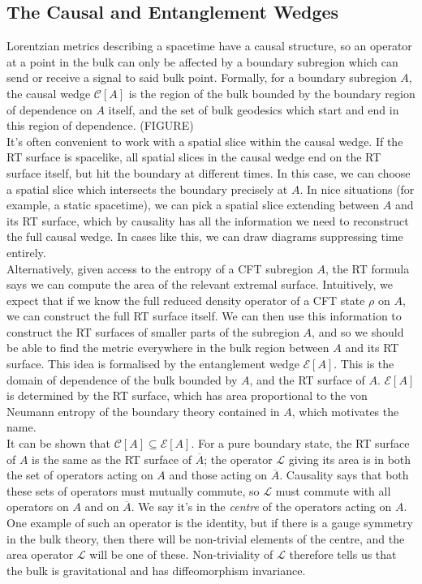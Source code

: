 \documentclass[12pt,a4paper]{report}
\numberwithin{equation}{section}
\newcommand{\ol}[1]{\overline{#1}}
\theoremstyle{definition}
\theoremstyle{theorem}
\theoremstyle{theorem}
\theoremstyle{example}
\theoremstyle{definition}
\begin{document}
\subsection{The Causal and Entanglement Wedges}
Lorentzian metrics describing a spacetime have a causal structure, so an operator at a point in the bulk can only be affected by a boundary subregion which can send or receive a signal to said bulk point. Formally, for a boundary subregion $A$, the causal wedge $\mathcal{C}[A]$ is the region of the bulk bounded by the boundary region of dependence on $A$ itself, and the set of bulk geodesics which start and end in this region of dependence. (FIGURE)\\
It's often convenient to work with a spatial slice within the causal wedge. If the RT surface is spacelike, all spatial slices in the causal wedge end on the RT surface itself, but hit the boundary at different times. In this case, we can choose a spatial slice which intersects the boundary precisely at $A$. In nice situations (for example, a static spacetime), we can pick a spatial slice extending between $A$ and its RT surface, which by causality has all the information we need to reconstruct the full causal wedge. In cases like this, we can draw diagrams suppressing time entirely.\\
Alternatively, given access to the entropy of a CFT subregion $A$, the RT formula says we can compute the area of the relevant extremal surface. Intuitively, we expect that if we know the full reduced density operator of a CFT state $\rho$ on $A$, we can construct the full RT surface itself. We can then use this information to construct the RT surfaces of smaller parts of the subregion $A$, and so we should be able to find the metric everywhere in the bulk region between $A$ and its RT surface. This idea is formalised by the entanglement wedge $\mathcal{E}[A]$. This is the domain of dependence of the bulk bounded by $A$, and the RT surface of $A$. $\mathcal{E}[A]$ is determined by the RT surface, which has area proportional to the von Neumann entropy of the boundary theory contained in $A$, which motivates the name.\\
It can be shown that $\mathcal{C}[A]\subseteq\mathcal{E}[A]$. For a pure boundary state, the RT surface of $A$ is the same as the RT surface of $\ol{A}$; the operator $\mathcal{L}$ giving its area is in both the set of operators acting on $A$ and those acting on $\ol{A}$. Causality says that both these sets of operators must mutually commute, so $\mathcal{L}$ must commute with all operators on $A$ and on $\ol{A}$. We say it's in the \textit{centre} of the operators acting on $A$. One example of such an operator is the identity, but if there is a gauge symmetry in the bulk theory, then there will be non-trivial elements of the centre, and the area operator $\mathcal{L}$ will be one of these. Non-triviality of $\mathcal{L}$ therefore tells us that the bulk is gravitational and has diffeomorphism invariance.
\end{document}
